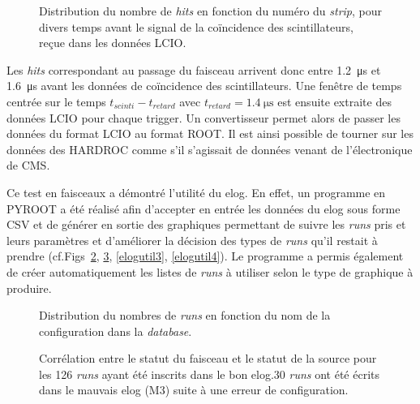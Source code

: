 \begin{figure}[ht!]
	\hfill
	\caption{Distribution du nombre de \textit{hits} en fonction du numéro du \textit{strip}, pour divers temps avant le signal de la coïncidence des scintillateurs, reçue dans les données LCIO.}
	\label{decalage}
\end{figure}  

Les \textit{hits} correspondant au passage du faisceau arrivent donc entre  \SI{1.2}{\micro\second} et \SI{1.6}{\micro\second} avant les données de coïncidence des scintillateurs. Une fenêtre de temps centrée sur le temps $t_{scinti}-t_{retard}$ avec $t_{retard}=\SI{1.4}{\micro\second}$ est ensuite extraite des données LCIO pour chaque trigger. Un convertisseur permet alors de passer les données du format LCIO au format ROOT. Il est ainsi possible de tourner sur les données des HARDROC comme s'il s'agissait de données venant de l'électronique de CMS.

Ce test en faisceaux a démontré l'utilité du elog. En effet, un programme en PYROOT a été réalisé afin d'accepter en entrée les données du elog sous forme CSV et de générer en sortie des graphiques permettant de suivre les \textit{runs} pris et leurs paramètres et d'améliorer la décision des types de \textit{runs} qu'il restait à prendre (cf.Figs~\ref{elogutil1}, \ref{elogutil2}, \ref{elogutil3}, \ref{elogutil4}). Le programme a permis également de créer automatiquement les listes de \textit{runs} à utiliser selon le type de graphique à produire. 

\begin{figure}[ht!]
	\centering
	\caption{Distribution du nombres de \textit{runs} en fonction du nom de la configuration dans la \textit{database}.}
	\label{elogutil1}	
\end{figure}

\begin{figure}[ht!]
	\centering
	\caption{Corrélation entre le statut du faisceau et le statut de la source pour les \num{126} \textit{runs} ayant été inscrits dans le bon elog.\num{30} \textit{runs} ont été écrits dans le mauvais elog (M3) suite à une erreur de configuration.}
	\label{elogutil2}	
\end{figure}

